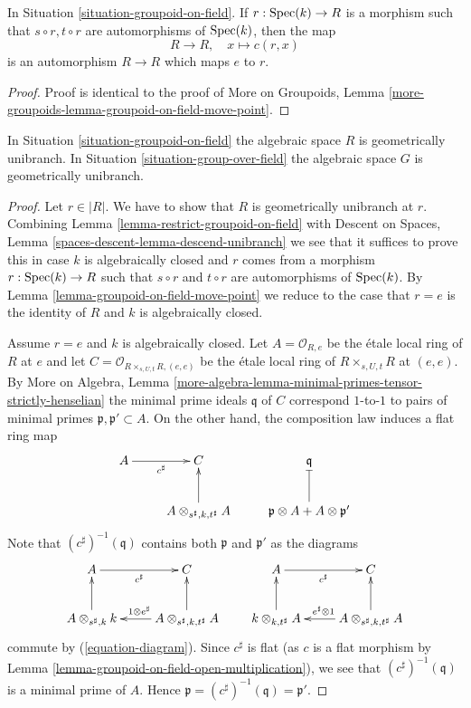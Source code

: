 \begin{lemma}
\label{lemma-groupoid-on-field-move-point}
In
Situation \ref{situation-groupoid-on-field}.
If $r : \mathop{\mathrm{Spec}}(k) \to R$ is a morphism such that
$s \circ r, t \circ r$ are automorphisms of $\mathop{\mathrm{Spec}}(k)$, then the map
$$
R \longrightarrow R, \quad
x \longmapsto c(r, x)
$$
is an automorphism $R \to R$ which maps $e$ to $r$.
\end{lemma}

\begin{proof}
Proof is identical to the proof of
More on Groupoids,
Lemma \ref{more-groupoids-lemma-groupoid-on-field-move-point}.
\end{proof}

\begin{lemma}
\label{lemma-groupoid-on-field-geometrically-irreducible}
In
Situation \ref{situation-groupoid-on-field}
the algebraic space $R$ is geometrically unibranch. In
Situation \ref{situation-group-over-field}
the algebraic space $G$ is geometrically unibranch.
\end{lemma}

\begin{proof}
Let $r \in |R|$. We have to show that $R$ is geometrically unibranch
at $r$. Combining
Lemma \ref{lemma-restrict-groupoid-on-field}
with
Descent on Spaces, Lemma \ref{spaces-descent-lemma-descend-unibranch}
we see that it suffices to prove this in case $k$ is algebraically closed
and $r$ comes from a morphism $r : \mathop{\mathrm{Spec}}(k) \to R$ such that
$s \circ r$ and $t \circ r$
are automorphisms of $\mathop{\mathrm{Spec}}(k)$. By
Lemma \ref{lemma-groupoid-on-field-move-point}
we reduce to the case that $r = e$ is the identity of $R$ and $k$ is
algebraically closed.

\medskip\noindent
Assume $r = e$ and $k$ is algebraically closed. Let
$A = \mathcal{O}_{R, e}$ be the \'etale local ring of
$R$ at $e$ and let
$C = \mathcal{O}_{R \times_{s, U, t} R, (e, e)}$
be the \'etale local ring of $R \times_{s, U, t} R$ at $(e, e)$.
By More on Algebra, Lemma
\ref{more-algebra-lemma-minimal-primes-tensor-strictly-henselian}
the minimal prime ideals $\mathfrak q$ of $C$ correspond $1$-to-$1$
to pairs of minimal primes $\mathfrak p, \mathfrak p' \subset A$.
On the other hand, the composition law induces a flat ring map
$$
\xymatrix{
A \ar[r]_{c^\sharp} & C & \mathfrak q \\
& A \otimes_{s^\sharp, k, t^\sharp} A \ar[u] &
\mathfrak p \otimes A + A \otimes \mathfrak p' \ar@{|}[u]
}
$$
Note that $(c^\sharp)^{-1}(\mathfrak q)$ contains both $\mathfrak p$ and
$\mathfrak p'$ as the diagrams
$$
\xymatrix{
A \ar[r]_{c^\sharp} & C \\
A \otimes_{s^\sharp, k} k \ar[u] &
A \otimes_{s^\sharp, k, t^\sharp} A \ar[l]_{1 \otimes e^\sharp} \ar[u]
}
\quad\quad
\xymatrix{
A \ar[r]_{c^\sharp} & C \\
k \otimes_{k, t^\sharp} A \ar[u] &
A \otimes_{s^\sharp, k, t^\sharp} A \ar[l]_{e^\sharp \otimes 1} \ar[u]
}
$$
commute by (\ref{equation-diagram}).
Since $c^\sharp$ is flat (as $c$ is a flat morphism by
Lemma \ref{lemma-groupoid-on-field-open-multiplication}),
we see that $(c^\sharp)^{-1}(\mathfrak q)$ is a minimal prime
of $A$. Hence $\mathfrak p = (c^\sharp)^{-1}(\mathfrak q) = \mathfrak p'$.
\end{proof}

